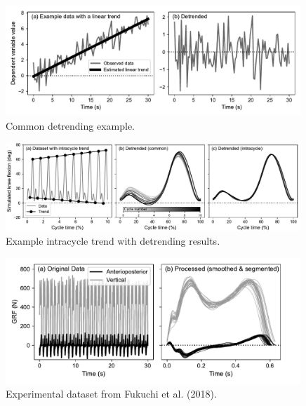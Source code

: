 




\begin{figure}[h]
\begin{center}
	\includegraphics[width=0.99\textwidth]{./figs/fig_common.pdf}\vspace{0mm}
	\caption[Dummy caption.]{Common detrending example.}
	\label{fig:common}
\end{center}
\end{figure}



\begin{figure}[h]
\begin{center}
	\includegraphics[width=0.99\textwidth]{./figs/fig_intracycle.pdf}\vspace{0mm}
	\caption[Dummy caption.]{Example intracycle trend with detrending results.}
	\label{fig:intracycle}
\end{center}
\end{figure}



\begin{figure}[h]
\begin{center}
	\includegraphics[width=0.99\textwidth]{./figs/fig_grf_dataset.pdf}\vspace{0mm}
	\caption[Dummy caption.]{Experimental dataset from Fukuchi et al. (2018).}
	\label{fig:grf_dataset}
\end{center}
\end{figure}




